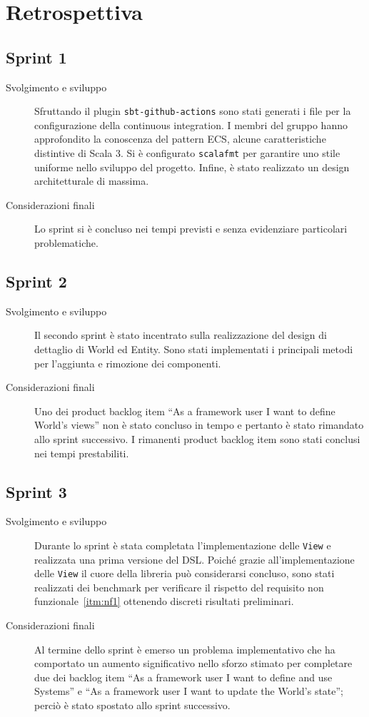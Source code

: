\chapter{Retrospettiva}\label{ch:retrospettiva}
\section{Sprint 1}\label{sec:sprint-1}
\begin{description}
    \item [Svolgimento e sviluppo] Sfruttando il plugin \texttt{sbt-github-actions} sono stati generati i file per la configurazione della continuous integration.
    I membri del gruppo hanno approfondito la conoscenza del pattern ECS, alcune caratteristiche distintive di Scala 3.
    Si è configurato \texttt{scalafmt} per garantire uno stile uniforme nello sviluppo del progetto.
    Infine, è stato realizzato un design architetturale di massima.
    \item [Considerazioni finali] Lo sprint si è concluso nei tempi previsti e senza evidenziare particolari problematiche.
\end{description}
\section{Sprint 2}\label{sec:sprint-2}
\begin{description}
    \item[Svolgimento e sviluppo] Il secondo sprint è stato incentrato sulla realizzazione del design di dettaglio di World ed Entity.
    Sono stati implementati i principali metodi per l'aggiunta e rimozione dei componenti.
    \item[Considerazioni finali] Uno dei product backlog item ``As a framework user I want to define World's views'' non è stato concluso
    in tempo e pertanto è stato rimandato allo sprint successivo.
    I rimanenti product backlog item sono stati conclusi nei tempi prestabiliti.
\end{description}
\section{Sprint 3}\label{sec:sprint-3}
\begin{description}
    \item[Svolgimento e sviluppo] Durante lo sprint è stata completata l'implementazione delle \texttt{View} e realizzata una prima versione del DSL\@.
    Poiché grazie all'implementazione delle \texttt{View} il cuore della libreria può considerarsi concluso, sono stati realizzati dei benchmark
    per verificare il rispetto del requisito non funzionale~\ref{itm:nf1} ottenendo discreti risultati preliminari.
    \item[Considerazioni finali] Al termine dello sprint è emerso un problema implementativo che ha comportato un aumento significativo nello sforzo
    stimato per completare due dei backlog item ``As a framework user I want to define and use Systems'' e ``As a framework user I want to update the World's state'';
    perciò è stato spostato allo sprint successivo.
\end{description}

